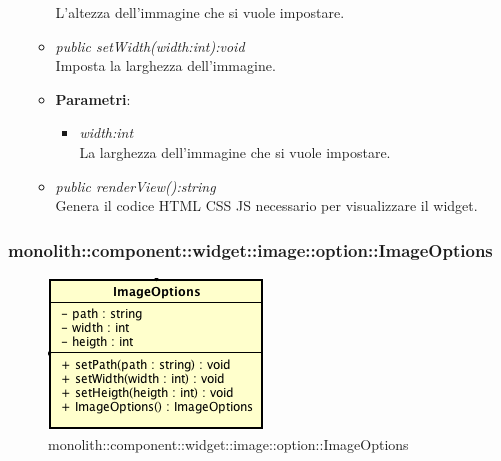 \begin{itemize}
\begin{itemize}
{\begin{itemize}
		L'altezza dell'immagine che si vuole impostare.
		\end{itemize}}
	\item \textit{public setWidth(width:int):void}\\
	Imposta la larghezza dell'immagine.
		\item{\textbf{Parametri}: \begin{itemize}
		\item \textit{width:int}\\
		La larghezza dell'immagine che si vuole impostare.
		\end{itemize}}
	\item \textit{public renderView():string}\\
	Genera il codice HTML CSS JS necessario per visualizzare il widget.
	\end{itemize}
\end{itemize}

\subsubsection{monolith::component::widget::image::option::ImageOptions}

\label{monolith::component::widget::image::option::ImageOptions}
\begin{figure}[ht]
	\centering
	\includegraphics[scale=0.5]{Sezioni/SottosezioniST/img/ImageOptions.png}
	\caption{monolith::component::widget::image::option::ImageOptions}
\end{figure}

